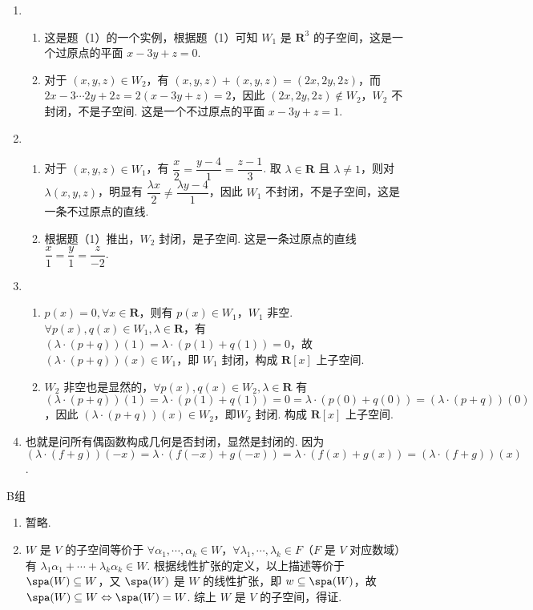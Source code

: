 \begin{enumerate}
\begin{enumerate}
        \item \begin{enumerate}
            \item 这是题（1）的一个实例，根据题（1）可知 $W_1$ 是 $\mathbf{R}^3$ 的子空间，这是一个过原点的平面 $x-3y+z=0$.
            \item 对于 $(x,y,z)\in W_2$，有 $(x,y,z)+(x,y,z)=(2x,2y,2z)$，而 $2x-3\cdots 2y+2z=2(x-3y+z)=2$，因此 $(2x,2y,2z)\not \in W_2$，$W_2$ 不封闭，不是子空间. 这是一个不过原点的平面 $x-3y+z=1$.
        \end{enumerate}

        \item \begin{enumerate}
            \item 对于 $(x,y,z)\in W_1$，有 $\dfrac x2=\dfrac{y-4}1=\dfrac{z-1}3$. 取 $\lambda \in \mathbf{R}$ 且 $\lambda\ne 1$，则对 $\lambda(x,y,z)$，明显有 $\dfrac{\lambda x}2\ne\dfrac{\lambda y-4}1$，因此 $W_1$ 不封闭，不是子空间，这是一条不过原点的直线.
            \item 根据题（1）推出，$W_2$ 封闭，是子空间. 这是一条过原点的直线 $\dfrac x1=\dfrac y1=\dfrac z{-2}$.
        \end{enumerate}

        \item \begin{enumerate}
            \item $p(x)=0,\forall x\in \mathbf{R}$，则有 $p(x)\in W_1$，$W_1$ 非空. $\forall p(x),q(x)\in W_1,\lambda \in\mathbf{R}$，有 $(\lambda\cdot(p+q))(1)=\lambda\cdot(p(1)+q(1))=0$，故$(\lambda\cdot(p+q))(x)\in W_1$，即 $W_1$ 封闭，构成 $\mathbf{R}[x]$ 上子空间.
            \item $W_2$ 非空也是显然的，$\forall p(x),q(x)\in W_2, \lambda \in \mathbf{R}$ 有 $(\lambda\cdot(p+q))(1)=\lambda\cdot(p(1)+q(1))=0=\lambda\cdot(p(0)+q(0))=(\lambda\cdot(p+q))(0)$，因此 $(\lambda\cdot(p+q))(x)\in W_2$，即$W_2$ 封闭. 构成 $\mathbf{R}[x]$ 上子空间.
        \end{enumerate}

        \item 也就是问所有偶函数构成几何是否封闭，显然是封闭的. 因为 $(\lambda\cdot(f+g))(-x)=\lambda\cdot(f(-x)+g(-x))=\lambda\cdot(f(x)+g(x))=(\lambda\cdot(f+g))(x)$.
    \end{enumerate}
\end{enumerate}

\centerline{\heiti B组}
\begin{enumerate}
    \item 暂略.
    \item $W$ 是 $V$ 的子空间等价于 $\forall \alpha_1,\cdots,\alpha_k\in W$，$\forall \lambda_1,\cdots,\lambda_k\in F$（$F$ 是 $V$ 对应数域）有 $\lambda_1\alpha_1+\cdots+\lambda_k\alpha_k\in W$. 根据线性扩张的定义，以上描述等价于 $\spa(W)\subseteq W$，又 $\spa(W)$ 是 $W$ 的线性扩张，即 $w\subseteq\spa(W)$，故$\spa(W)\subseteq W\Leftrightarrow \spa(W)=W$. 综上 $W$ 是 $V$ 的子空间，得证.
\end{enumerate}

